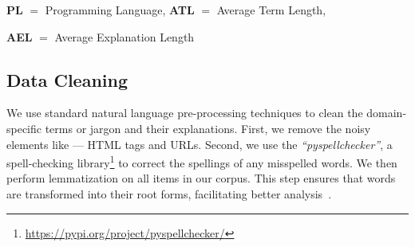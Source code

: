 \renewcommand{\arraystretch}{1.4}
\begin{table}[htbp]
\centering
\caption{Dataset Details}
\label{tab:dataset}
    \vspace{-0.1cm}
\begin{threeparttable}
\begin{tablenotes}[flushleft]
  \small
  \item \begin{center}
      \item \textbf{PL} $=$ Programming Language, \textbf{ATL} $=$ Average Term Length,
      \item \textbf{AEL} $=$ Average Explanation Length
  \end{center} 
\end{tablenotes}
\end{threeparttable}
\end{table}

\subsection{Data Cleaning}
We use standard natural language pre-processing techniques to clean the domain-specific terms or jargon and their explanations. First, we remove the noisy elements like --- HTML tags and URLs. Second, we use the \textit{``pyspellchecker''}, a spell-checking library\footnote{\url{https://pypi.org/project/pyspellchecker/}\label{spellchecker}} to correct the spellings of any misspelled words. We then perform lemmatization on all items in our corpus. This step ensures that words are transformed into their root forms, facilitating better analysis~\cite{pramana2022systematic}.\par

